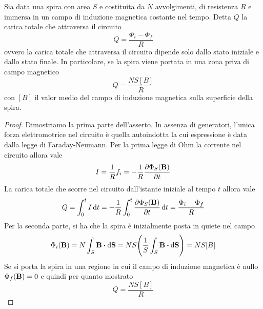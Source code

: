 \begin{thm}
    \label{teo:felici}
    Sia data una spira con area $S$ e costituita da $N$ avvolgimenti, di resistenza $R$ e immersa in un campo
    di induzione magnetica costante nel tempo. Detta $Q$ la carica totale che attraversa il circuito
    \[
        Q=\frac{\Phi_i-\Phi_f}{R}
    \]
    ovvero la carica totale che attraversa il circuito dipende solo dallo stato iniziale e dallo stato finale.
    In particolare, se la spira viene portata in una zona priva di campo magnetico
    \[
        Q=\frac{NS[B]}{R}
    \]
    con $[B]$ il valor medio del campo di induzione magnetica sulla superficie della spira.
\end{thm}
\begin{proof}
    Dimostriamo la prima parte dell'asserto.
    In assenza di generatori, l'unica forza elettromotrice nel circuito è quella autoindotta la cui espressione
    è data dalla legge di Faraday-Neumann. Per la prima legge di Ohm la corrente nel circuito allora vale
    \[
        I=\frac{1}{R}f_i=-\frac{1}{R}\pdv{\Phi_S(\vb{B})}{t}
    \]
    La carica totale che scorre nel circuito dall'istante iniziale al tempo $t$ allora vale
    \[
        Q=\int_0^t I\dd{t}=-\frac{1}{R}\int_0^t\pdv{\Phi_S(\vb{B})}{t}\dd{t}=\frac{\Phi_i-\Phi_f}{R}
    \]
    Per la seconda parte, si ha che la spira è inizialmente posta in quiete nel campo
    \[
        \Phi_i(\vb{B})=N\int_S \vb{B}\vdot\dd{\vb{S}}=NS\Biggl(\rec{S}\int_S \vb{B}\vdot\dd{\vb{S}} \Biggr)=NS[B]
    \]
    Se si porta la spira in una regione in cui il campo di induzione magnetica è nullo $\Phi_f(\vb{B})=0$ e quindi
    per quanto mostrato
    \[
        Q=\frac{NS[B]}{R}
    \]
\end{proof}
